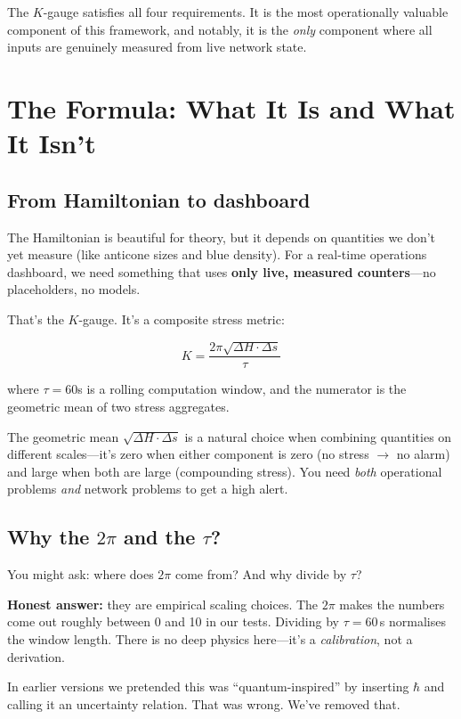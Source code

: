 \documentclass[11pt,a4paper]{article}
\begin{document}
The $K$-gauge satisfies all four requirements. It is the most operationally valuable component of this framework, and notably, it is the \emph{only} component where all inputs are genuinely measured from live network state.

\section{The Formula: What It Is and What It Isn't}

\subsection{From Hamiltonian to dashboard}

The Hamiltonian is beautiful for theory, but it depends on quantities we don't yet measure (like anticone sizes and blue density). For a real-time operations dashboard, we need something that uses \textbf{only live, measured counters}---no placeholders, no models.

That's the $K$-gauge. It's a composite stress metric:

\begin{equation}
\boxed{K = \frac{2\pi\sqrt{\Delta H \cdot \Delta s}}{\tau}}
\label{eq:kgauge}
\end{equation}

where $\tau = 60$s is a rolling computation window, and the numerator is the geometric mean of two stress aggregates.

The geometric mean $\sqrt{\Delta H \cdot \Delta s}$ is a natural choice when combining quantities on different scales---it's zero when either component is zero (no stress $\to$ no alarm) and large when both are large (compounding stress). You need \emph{both} operational problems \emph{and} network problems to get a high alert.

\subsection{Why the $2\pi$ and the $\tau$?}

You might ask: where does $2\pi$ come from? And why divide by $\tau$?

\textbf{Honest answer:} they are empirical scaling choices. The $2\pi$ makes the numbers come out roughly between 0 and 10 in our tests. Dividing by $\tau = 60\,$s normalises the window length. There is no deep physics here---it's a \emph{calibration}, not a derivation.

In earlier versions we pretended this was ``quantum-inspired'' by inserting $\hbar$ and calling it an uncertainty relation. That was wrong. We've removed that.
\end{document}
